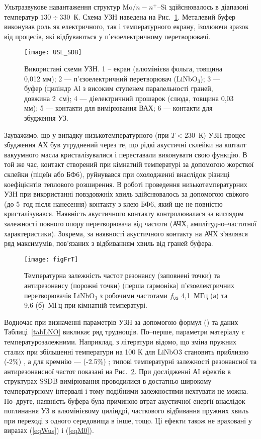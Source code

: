 \documentclass[a4paper,14pt,oneside,openany]{memoir}
\begin{document}
Ультразвукове навантаження структур Mo$/n-n^+$--Si здійснювалось в діапазоні температур $130\div330$~К.
Схема УЗН наведена на Рис.~\ref{figUSL:SDB}.
Металевий буфер виконував роль як електричного, так і температурного екрану, ізолюючи зразок від процесів, які відбуваються у
п'єзоелектричному перетворювачі.


\begin{figure}[b]
\center
\texttt{[image: USL\_SDB]}%
\caption{\label{figUSL:SDB}
Використані схеми УЗН.
1 --  екран (алюмінієва фольга, товщина 0,012 мм);
2 --- п'єзоелектричний перетворювач (LiNbO$_3$);
3 --- буфер (циліндр Al з високим ступенем паралельності граней, довжина 2~см);
4 --- діелектричний прошарок (слюда, товщина 0,03 мм);
5 --- контакти для вимірювання ВАХ;
6 --- контакти для збудження УЗ.
}
\end{figure}


Зауважимо, що у випадку низькотемпературного (при $T<230$~К) УЗН процес збудження АХ був утруднений через те, що
рідкі акустичні склейки на кшталт вакуумного масла кристалізувалися і переставали виконувати свою функцію.
В той же час, контакт створений при кімнатній температурі за допомогою жорсткої склейки (піцеїн або БФ6),
руйнувався при охолодженні внаслідок різниці коефіцієнтів теплового розширення.
В роботі проведення низькотемпературних УЗН при використанні повздовжніх хвиль здійснювалось за допомогою свіжого (до 5~год після нанесення) контакту з клею БФ6,
який ще не повністю кристалізувався.
Наявність акустичного контакту контролювалася за виглядом залежності повного опору перетворювача від частоти (АЧХ, амплітудно--частотної характеристики).
Зокрема, за наявності акустичного контакту на АЧХ з'являвся ряд максимумів, пов'язаних з відбиванням хвиль від граней буфера.

\begin{figure}
\center
\texttt{[image: figFrT]}%
\caption{\label{figFrT}
Температурна залежність частот резонансу (заповнені точки) та антирезонансу (порожні точки) (перша гармоніка)
п'єзоелектричних перетворювачів LiNbO$_3$ з робочими частотами $f_\mathtt{US}$ 4,1~МГц (а) та 9,6 (б)~МГц при кімнатній температурі.
}
\end{figure}


Водночас при визначенні параметрів УЗН за допомогою формул () та даних Таблиці~\ref{tabLNO} викликає ряд труднощів.
По--перше, параметри матеріалу є температурозалежними.
Наприклад, з літератури відомо, що зміна пружних сталих при збільшенні температури на 100 К для LiNbO3 становить приблизно (-2\%) \cite{LNO_C:Temp},
а для кремнію --- (-2.5\%) \cite{Si_C:Temp};
типові температурні залежності резонансної та антирезонансної частот показані на Рис.~\ref{figFrT}.
При дослідженні АІ ефектів в структурах SSDB вимірювання проводилися в достатньо широкому температурному інтервалі і тому подібними залежностями нехтувати не можна.
По--друге, наявність буфера була причиною втрат акустичної енергії внаслідок поглинання УЗ в алюмінієвому циліндрі, часткового відбивання пружних хвиль
при переході з одного середовища в інше, тощо.
Ці ефекти також не враховані у виразах (\ref{eqWus}) і  (\ref{eqM0}).
\end{document}
